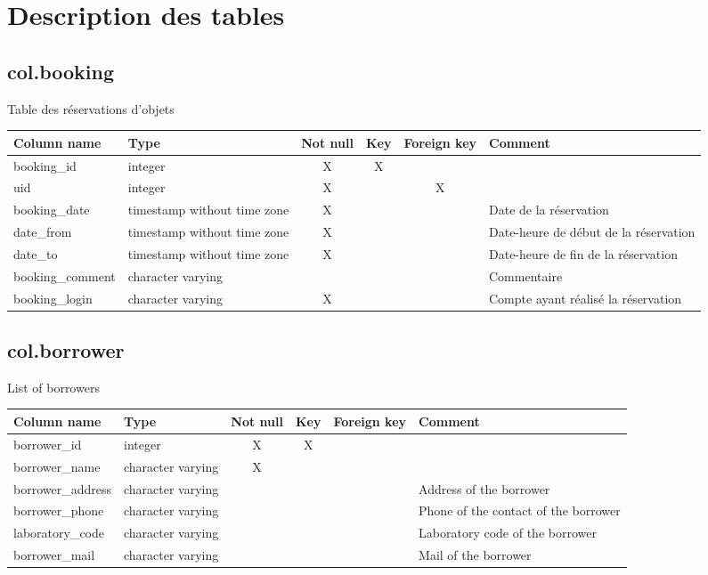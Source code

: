\section{Description des tables}

\subsection{col.booking}
Table des réservations d'objets

\begin{tabular}{|l| p{2cm}|c|c|c| p{3cm}|}
\hline
Column name & Type & Not null & Key & Foreign key & Comment \\
\hline
booking\_id & integer & X & X & & \\
\hline
uid & integer & X & & X & \\
\hline
booking\_date & timestamp without time zone & X & & & Date de la réservation\\
\hline
date\_from & timestamp without time zone & X & & & Date-heure de début de la réservation\\
\hline
date\_to & timestamp without time zone & X & & & Date-heure de fin de la réservation\\
\hline
booking\_comment & character varying & & & & Commentaire\\
\hline
booking\_login & character varying & X & & & Compte ayant réalisé la réservation\\
\hline
\end{tabular}
\subsection{col.borrower}
List of borrowers

\begin{tabular}{|l| p{2cm}|c|c|c| p{3cm}|}
\hline
Column name & Type & Not null & Key & Foreign key & Comment \\
\hline
borrower\_id & integer & X & X & & \\
\hline
borrower\_name & character varying & X & & & \\
\hline
borrower\_address & character varying & & & & Address of the borrower\\
\hline
borrower\_phone & character varying & & & & Phone of the contact of the borrower\\
\hline
laboratory\_code & character varying & & & & Laboratory code of the borrower\\
\hline
borrower\_mail & character varying & & & & Mail of the borrower\\
\hline
\end{tabular}
